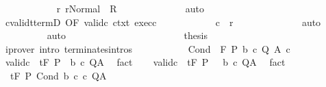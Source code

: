 \begin{isabellebody}
\ \ \ \ \ \ \ \ \ \ \isamarkupfalse%
\ r{\isacharcolon}\ {\isachardoublequoteopen}r{\isasymin}Normal\ {\isacharbackquote}\ R{\isachardoublequoteclose}\isanewline
\ \ \ \ \ \ \ \ \ \ \ \ \isamarkupfalse%
\ auto\isanewline
\ \ \ \ \ \ \ \ \ \ \isamarkupfalse%
\ cvalidt{\isacharunderscore}termD\ {\isacharbrackleft}OF\ valid{\isacharunderscore}c{}\ ctxt{\isacharbrackright}\ exec{\isacharunderscore}c{}\isanewline
\ \ \ \ \ \ \ \ \ \ \isamarkupfalse%
\ {\isachardoublequoteopen}{\isasymGamma}{\isasymturnstile}c{}\ {\isasymdown}\ r{\isachardoublequoteclose}\isanewline
\ \ \ \ \ \ \ \ \ \ \ \ \isamarkupfalse%
\ auto\isanewline
\ \ \ \ \ \ \ \ \isamarkupfalse%
\ auto\ \ \ \ \ \ \ \ \isanewline
\ \ \ \ \ \ \isacommand{{\isacharbraceright}}\isamarkupfalse%
\isanewline
\ \ \ \ \ \ \isamarkupfalse%
\ \isamarkupfalse%
\ {\isacharquery}thesis\isanewline
\ \ \ \ \ \ \ \ \isamarkupfalse%
\ {\isacharparenleft}iprover\ intro{\isacharcolon}\ terminates{\isachardot}intros{\isacharparenright}\isanewline
\ \ \ \ \isamarkupfalse%
\isanewline
\ \ \isamarkupfalse%
\isanewline
{}\isamarkupfalse%
\isanewline
\ \ \isamarkupfalse%
\ {\isacharparenleft}Cond\ {\isasymTheta}\ F\ P\ b\ c{}\ Q\ A\ c{}{\isacharparenright}\isanewline
\ \ \isamarkupfalse%
\ valid{\isacharunderscore}c{}{\isacharcolon}\ {\isachardoublequoteopen}{\isasymGamma}{\isacharcomma}{\isasymTheta}\ {\isasymTurnstile}\isactrlsub t\isactrlbsub {\isacharslash}F\isactrlesub \ {\isacharparenleft}P\ {\isasyminter}\ b{\isacharparenright}\ c{}\ Q{\isacharcomma}A{\isachardoublequoteclose}\ \isamarkupfalse%
\ fact\isanewline
\ \ \isamarkupfalse%
\ valid{\isacharunderscore}c{}{\isacharcolon}\ {\isachardoublequoteopen}{\isasymGamma}{\isacharcomma}{\isasymTheta}\ {\isasymTurnstile}\isactrlsub t\isactrlbsub {\isacharslash}F\isactrlesub \ {\isacharparenleft}P\ {\isasyminter}\ {\isacharminus}\ b{\isacharparenright}\ c{}\ Q{\isacharcomma}A{\isachardoublequoteclose}\ \isamarkupfalse%
\ fact\isanewline
\ \ \isamarkupfalse%
\ {\isachardoublequoteopen}{\isasymGamma}{\isacharcomma}{\isasymTheta}\ {\isasymTurnstile}\isactrlsub t\isactrlbsub {\isacharslash}F\isactrlesub \ P\ Cond\ b\ c{}\ c{}\ Q{\isacharcomma}A{\isachardoublequoteclose}\isanewline

\end{isabellebody}
